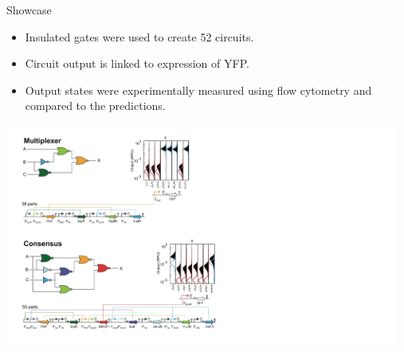 \documentclass[10pt]{beamer}
\begin{document}
\begin{frame}{Showcase}

    \begin{minipage}{.4\textwidth}
        \centering
        \begin{itemize}
            \item Insulated gates were used to create 52 circuits. 
            \item Circuit output is linked to expression of YFP.
            \item Output states were experimentally measured using flow cytometry and compared to the predictions. 
        \end{itemize}
    \end{minipage}%
    \begin{minipage}{.6\textwidth}
        \centering
        \includegraphics[width=13cm]{examples.jpg}
    \end{minipage}

\end{frame}

\begin{frame}{Challenges}
    \centering
    }%
\end{frame}
\end{document}
